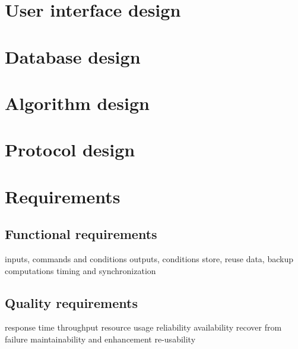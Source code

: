 \section{User interface design}

\section{Database design}

\section{Algorithm design}

\section{Protocol design}


\section{Requirements} %

\subsection{Functional requirements} %

inputs, commands and conditions
outputs, conditions
store, reuse data, backup
computations
timing and synchronization

\subsection{Quality requirements}

response time
throughput
resource usage
reliability
availability
recover from failure
maintainability and enhancement
re-usability

